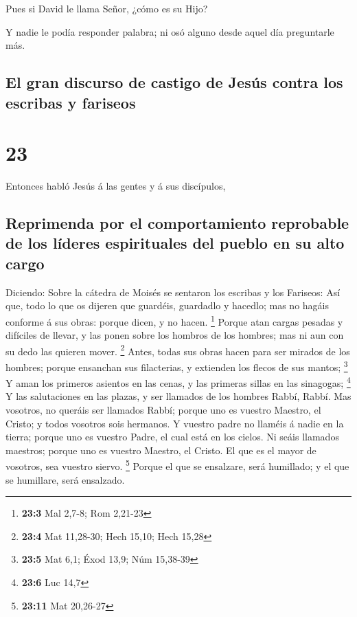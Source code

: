  Pues si David le llama Señor, ¿cómo es su Hijo?

 Y nadie le podía responder palabra; ni osó alguno desde
aquel día preguntarle más.

\hypertarget{el-gran-discurso-de-castigo-de-jesuxfas-contra-los-escribas-y-fariseos}{%
\subsection{El gran discurso de castigo de Jesús contra los escribas y
fariseos}\label{el-gran-discurso-de-castigo-de-jesuxfas-contra-los-escribas-y-fariseos}}

\hypertarget{section-22}{%
\section{23}\label{section-22}}

 Entonces habló Jesús á las gentes y á sus discípulos,

\hypertarget{reprimenda-por-el-comportamiento-reprobable-de-los-luxedderes-espirituales-del-pueblo-en-su-alto-cargo}{%
\subsection{Reprimenda por el comportamiento reprobable de los líderes
espirituales del pueblo en su alto
cargo}\label{reprimenda-por-el-comportamiento-reprobable-de-los-luxedderes-espirituales-del-pueblo-en-su-alto-cargo}}

 Diciendo: Sobre la cátedra de Moisés se sentaron los
escribas y los Fariseos:  Así que, todo lo que os dijeren
que guardéis, guardadlo y hacedlo; mas no hagáis conforme á sus obras:
porque dicen, y no hacen. \footnote{\textbf{23:3} Mal 2,7-8; Rom 2,21-23}
 Porque atan cargas pesadas y difíciles de llevar, y las
ponen sobre los hombros de los hombres; mas ni aun con su dedo las
quieren mover. \footnote{\textbf{23:4} Mat 11,28-30; Hech 15,10; Hech
  15,28}  Antes, todas sus obras hacen para ser mirados de
los hombres; porque ensanchan sus filacterias, y extienden los flecos de
sus mantos; \footnote{\textbf{23:5} Mat 6,1; Éxod 13,9; Núm 15,38-39}
 Y aman los primeros asientos en las cenas, y las primeras
sillas en las sinagogas; \footnote{\textbf{23:6} Luc 14,7} 
Y las salutaciones en las plazas, y ser llamados de los hombres Rabbí,
Rabbí.  Mas vosotros, no queráis ser llamados Rabbí; porque
uno es vuestro Maestro, el Cristo; y todos vosotros sois hermanos.
 Y vuestro padre no llaméis á nadie en la tierra; porque uno
es vuestro Padre, el cual está en los cielos.  Ni seáis
llamados maestros; porque uno es vuestro Maestro, el Cristo.
 El que es el mayor de vosotros, sea vuestro siervo.
\footnote{\textbf{23:11} Mat 20,26-27}  Porque el que se
ensalzare, será humillado; y el que se humillare, será ensalzado.

